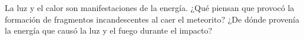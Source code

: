 La luz y el calor son manifestaciones de la energía. ¿Qué piensan que provocó la formación de fragmentos incandescentes al caer el meteorito? ¿De dónde provenía la energía que causó la luz y el fuego durante el impacto?

\begin{solutionbox}{2cm}
\end{solutionbox}
